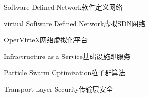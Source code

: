 

{Software Defined Network}{软件定义网络}

{virtual Software Defined Network}{虚拟SDN网络}

{OpenVirteX}{网络虚拟化平台}

{Infrastructure as a Service}{基础设施即服务}

{Particle Swarm Optimization}{粒子群算法}

{Transport Layer Security}{传输层安全}